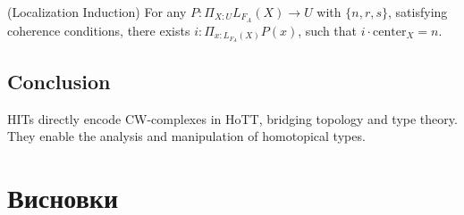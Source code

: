 \begin{theorem} (Localization Induction)
For any \( P : \Pi_{X:U} L_{F_A}(X) \to U \) with \( \{n, r, s\} \), satisfying coherence conditions,
there exists \( i : \Pi_{x:L_{F_A}(X)} P(x) \), such that \( i \cdot \text{center}_X = n \).
\end{theorem}

\subsection*{Conclusion}
HITs directly encode CW-complexes in HoTT, bridging topology and type theory.
They enable the analysis and manipulation of homotopical types.

\section{Висновки}

